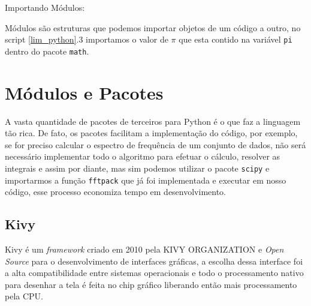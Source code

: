             Importando Módulos:
            
            Módulos são estruturas que podemos importar objetos de um código a outro,
            no script \ref{lim_python}.3 importamos o valor de $\pi$ que esta contido na variável \verb|pi| dentro do pacote \verb|math|. 
            
            \begin{quote}
                                                        
            \end{quote}
            
        \section{Módulos e Pacotes}
            
            A vasta quantidade de pacotes de terceiros para Python é o que faz a linguagem tão rica.
            De fato, os 
            pacotes facilitam a implementação do código, por exemplo, se for preciso calcular o espectro de 
            frequência de um conjunto de dados, não será necessário implementar todo o algoritmo para efetuar o cálculo, resolver as integrais e assim por diante, mas sim podemos utilizar o pacote \verb|scipy| e importarmos a função \verb|fftpack| que já foi implementada e executar em nosso código, esse processo economiza tempo em desenvolvimento.           
            
            \subsection{Kivy}
            
            
            \label{lim_kivy}
            Kivy é um \textit{framework} criado em 2010 pela KIVY ORGANIZATION \cite{kivy} e \textit{Open Source} para o desenvolvimento de interfaces gráficas, a escolha dessa interface foi a alta compatibilidade entre sistemas operacionais e todo o processamento nativo para desenhar a tela é feita no chip gráfico liberando então mais processamento pela CPU.
            
